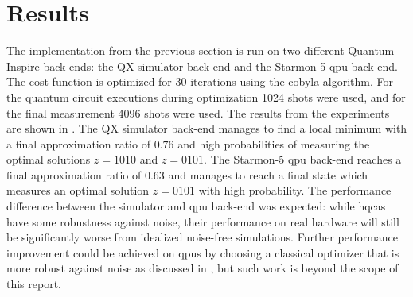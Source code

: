 \section{Results}
The implementation from the previous section is run on two different Quantum Inspire back-ends: the QX simulator back-end and the Starmon-5 \gls{qpu} back-end.
The cost function is optimized for 30 iterations using the \gls{cobyla} algorithm.
For the quantum circuit executions during optimization 1024 shots were used, and for the final measurement 4096 shots were used.
The results from the experiments are shown in .
The QX simulator back-end manages to find a local minimum with a final approximation ratio of $0.76$ and high probabilities of measuring the optimal solutions $z = 1010$ and $z = 0101$.
The Starmon-5 \gls{qpu} back-end reaches a final approximation ratio of $0.63$ and manages to reach a final state which measures an optimal solution $z = 0101$ with high probability.
The performance difference between the simulator and \gls{qpu} back-end was expected: while \glspl{hqca} have some robustness against noise, their performance on real hardware will still be significantly worse from idealized noise-free simulations.
Further performance improvement could be achieved on \glspl{qpu} by choosing a classical optimizer that is more robust against noise as discussed in \cite{lavrijsen2020classical, sung2020exploration}, but such work is beyond the scope of this report.

